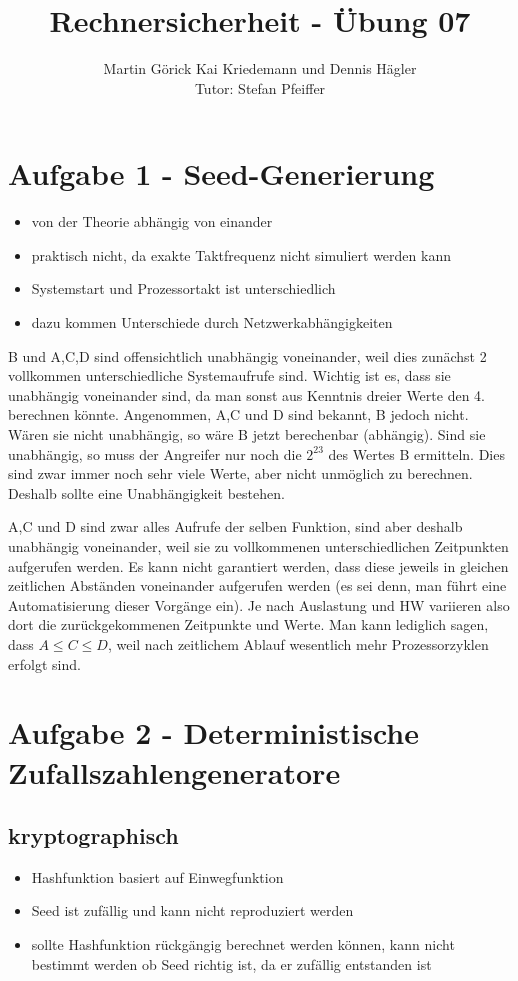 \documentclass{scrartcl}
\title{Rechnersicherheit - Übung 07}
\author{Martin Görick Kai Kriedemann und Dennis Hägler \\ Tutor: Stefan Pfeiffer}
\begin{document}
\maketitle


\section*{Aufgabe 1 - Seed-Generierung}
\begin{itemize}
  \item von der Theorie abhängig von einander
  \item praktisch nicht, da exakte Taktfrequenz nicht simuliert werden kann
  \item Systemstart und Prozessortakt ist unterschiedlich
  \item dazu kommen Unterschiede durch Netzwerkabhängigkeiten
\end{itemize}

B und A,C,D sind offensichtlich unabhängig voneinander, weil dies zunächst 2 vollkommen unterschiedliche 
Systemaufrufe sind. Wichtig ist es, dass sie unabhängig voneinander sind, da man sonst aus Kenntnis dreier 
Werte den 4. berechnen könnte. Angenommen, A,C und D sind bekannt, B jedoch nicht. Wären sie nicht unabhängig, 
so wäre B jetzt berechenbar (abhängig). Sind sie unabhängig, so muss der Angreifer nur noch die $2^{23}$ des 
Wertes B ermitteln. Dies sind zwar immer noch sehr viele Werte, aber nicht unmöglich zu berechnen. Deshalb 
sollte eine Unabhängigkeit bestehen.
\newline

A,C und D sind zwar alles Aufrufe der selben Funktion, sind aber deshalb unabhängig voneinander, weil sie zu 
vollkommenen unterschiedlichen Zeitpunkten aufgerufen werden. Es kann nicht garantiert werden, dass diese jeweils in gleichen 
zeitlichen Abständen voneinander aufgerufen werden (es sei denn, man führt eine Automatisierung dieser 
Vorgänge ein). Je nach Auslastung und HW variieren also dort die zurückgekommenen Zeitpunkte und Werte. 
Man kann lediglich sagen, dass $A \leq C \leq D$, weil nach zeitlichem Ablauf wesentlich mehr 
Prozessorzyklen erfolgt sind.

\section*{Aufgabe 2 - Deterministische Zufallszahlengeneratore}
\subsection*{kryptographisch}
\begin{itemize}
  \item Hashfunktion basiert auf Einwegfunktion
  \item Seed ist zufällig und kann nicht reproduziert werden
  \item sollte Hashfunktion rückgängig berechnet werden können, kann nicht
    bestimmt werden ob Seed richtig ist, da er zufällig entstanden ist
\end{itemize}
\end{document}
